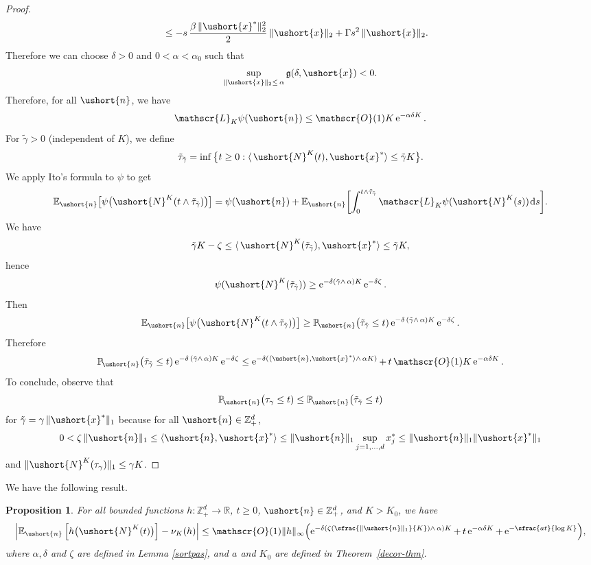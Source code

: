 \documentclass[JEP,XML,SOM,Unicode]{cedram}
\newcommand{\Psfrac}[2]{(\sfrac{#1}{#2})}
\newcommand{\scaleto}[2]{#1}
\let\mathcal\mathscr
\numberwithin{equation}{section}
\theoremstyle{plain}
\newtheorem{proposition}[theorem]{Proposition}
\theoremstyle{definition}
\newcommand{\proba}{{\mathbb{P}}}
\newcommand{\E}{{\mathbb{E}}}
\newcommand{\real}{\mathbb{R}}
\newcommand{\zentiers}{{\mathbb{Z}}}
\newcommand{\domaine}{\zentiers_{+}^{d}}
\newcommand{\Oun}{\mathcal{O}(1)}
\newcommand{\sK}{K}
\newcommand{\gen}{\mathscr{L}_{\sK}}
\newcommand{\vecn}{\ushort{n}}
\newcommand{\vecxf}{\ushort{x}^*}
\newcommand{\vecx}{\ushort{x}}
\newcommand{\leproc}{\ushort{N}^{K}}
\newcommand{\nuk}{\nu_{K}}\let\snuk\nuk
\newcommand{\e}{\operatorname{e}}
\newcommand{\dd}{\hspace{1pt}\mathrm{d}}
\newcommand{\norm}[1]{\|#1\|_{1}}\let\snorm\norm
\newcommand{\normdeux}[1]{\|#1\|_{2}}\let\snormdeux\normdeux
\begin{document}
\begin{proof}
\begin{align*}
& \le -s\,\frac{\beta\,\normdeux{\vecxf}^{2}}{2}\,\normdeux{\vecx} +\Gamma s^{2}\, \normdeux{\vecx}.
\end{align*}
Therefore we can choose $\delta>0$ and $0<\alpha<\alpha_0$ such that
\[
\sup_{\snormdeux{\vecx}\le\, \alpha}\mathfrak{g}(\delta,\vecx)<0.
\]
Therefore, for all $\vecn$, we have
\[
\gen \psi(\vecn)\le \Oun K \e^{-\alpha\delta K}.
\]
For $\tilde{\gamma}>0$ (independent of $K$), we define
\[
\tilde{\tau}_{\tilde \gamma}=\inf\big\{t\geq 0 : \langle\, \leproc(t),\vecxf\rangle\le \tilde \gamma K\big\}.
\]
We apply Ito's formula to $\psi$ to get
\[
\E_{\vecn}\bigl[\psi\bigl(\leproc(t\wedge\tilde{\tau}_{\tilde \gamma})\bigr)\bigr]
=\psi(\vecn)+\E_{\vecn}\biggl[\int_{0}^{t\wedge\tilde{\tau}_{\tilde \gamma}}\gen\psi(\leproc(s))\dd s\biggr].
\]
We have
\[
\tilde{\gamma}K-\zeta \leq \langle\, \leproc(\tilde{\tau}_{\tilde \gamma}),\vecxf\rangle \leq \tilde{\gamma} K,
\]
hence
\[
\psi(\leproc(\tilde{\tau}_{\tilde \gamma}))\geq \e^{-\delta(\tilde{\gamma}\wedge\, \alpha)K} \e^{-\delta \zeta}.
\]
Then
\[
\E_{\vecn}\bigl[\psi\bigl(\leproc(t\wedge\tilde{\tau}_{\tilde \gamma})\bigr)\bigr]
\geq \proba_{\!\vecn}\bigl(\tilde{\tau}_{\tilde \gamma}\leq t)\e^{-\delta\,(\tilde \gamma\wedge\, \alpha) K}\e^{-\delta \zeta}.
\]
Therefore
\[
\proba_{\!\vecn}\bigl(\tilde{\tau}_{\tilde \gamma}\leq t)\e^{-\delta\,(\tilde \gamma\wedge\,\alpha) K}\e^{-\delta \zeta}
\le \e^{-\delta(\langle \vecn,\vecxf\rangle \wedge\,\alpha K)}+\,t\, \Oun K \e^{-\alpha\delta K}.
\]
To conclude, observe that
\[
\proba_{\!\vecn}\bigl(\tau_{\gamma}\leq t)
\leq
\proba_{\!\vecn}\bigl(\tilde{\tau}_{\tilde \gamma}\leq t)
\]
for $\tilde{\gamma}=\gamma\, \norm{\vecxf}$ because for all $\vecn\in\domaine$,
\[
0<\zeta\, \norm{\vecn} \leq \langle \vecn,\vecxf \rangle
\leq \norm{\vecn}\sup_{j=1,\ldots,d} x^*_{j} \leq \norm{\vecn} \|\vecxf\|_1
\]
and $\| \leproc(\tau_{\gamma})\|_1\leq \gamma K$.
\end{proof}

We have the following result.

\begin{proposition}
\label{pre-theorem-ergodic}
For all bounded functions $h:\domaine\to\real$, $t\ge 0$, $\vecn\in \domaine$, and $K>K_{0}$, we have
\[
\left|\E_{\vecn}\left[h\bigl(\leproc(t)\bigr)\right]-\nuk(h)\right|
\le \Oun \|h\|_{\scaleto{\infty}{3pt}}\Bigl(\e^{-\delta\left(\zeta\Psfrac{\|\vecn\|_{1}}{K}\wedge\,\alpha\right) K}
+\, t \e^{-\alpha\delta K}+\e^{-\sfrac{a t}{\log K}}\Bigr),
\]
where $\alpha, \delta$ and $\zeta$ are defined in Lemma \ref{sortpas}, and $a$ and $K_0$ are defined in Theorem~\ref{decor-thm}.
\end{proposition}
\end{document}
